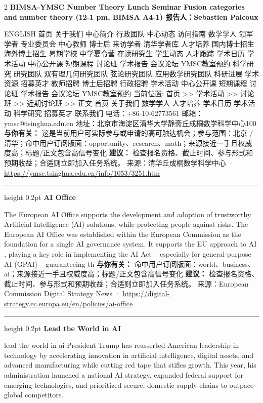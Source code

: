 \documentclass[10.5pt]{ctexart}
\begin{document}
\begin{multicols}{2}
{\large\bfseries BIMSA-YMSC Number Theory Lunch Seminar Fusion categories and number theory (12-1 pm, BIMSA A4-1) 报告人：Sebastien Palcoux}\par
ENGLISH 首页 关于我们 中心简介 行政团队 中心动态 访问指南 数学学人 领军学者 专业委员会 中心教师 博士后 来访学者 清华学者库 人才培养 国内博士招生 海外博士招生 暑期学校 中学夏令营 在读研究生 学生动态 人才跟踪 学术日历 学术活动 中心公开课 短期课程 讨论班 学术报告 会议论坛 YMSC教室预约 科学研究 研究团队 双有理几何研究团队 弦论研究团队 应用数学研究团队 科研进展 学术资源 招募英才 教师招聘 博士后招聘 行政招聘 学术活动 中心公开课 短期课程 讨论班 学术报告 会议论坛 YMSC教室预约 当前位置: 首页 >> 学术活动 >> 讨论班 >> 近期讨论班 >> 正文 首页 关于我们 数学学人 人才培养 学术日历 学术活动 科学研究 招募英才 联系我们 电话：+86-10-62773561 邮箱：ymsc@tsinghua.edu.cn 地址：北京市海淀区清华大学静斋丘成桐数学科学中心100
\textbf{与你有关：} 这是当前用户可实际参与或申请的高可触达机会；参与范围：北京 / 清华；命中用户订阅版面：opportunity、research、math；来源接近一手且权威度高；标题/正文包含高信号变化
\textbf{建议：} 检查报名资格、截止时间、参与形式和预期收益；合适则立即加入任务系统。
{\footnotesize\color{ormuted} 来源：清华丘成桐数学科学中心 · \url{https://ymsc.tsinghua.edu.cn/info/1053/3251.htm}}
\vspace{2mm}
\hrule height 0.2pt
\vspace{2mm}
{\large\bfseries AI Office}\par
The European AI Office supports the development and adoption of trustworthy Artificial Intelligence (AI) solutions, while protecting people against risks. The European AI Office was established within the European Commission as the foundation for a single AI governance system. It supports the EU approach to AI , playing a key role in implementing the AI Act – especially for general-purpose AI (GPAI) – guaranteeing th
\textbf{与你有关：} 命中用户订阅版面：world、business、ai；来源接近一手且权威度高；标题/正文包含高信号变化
\textbf{建议：} 检查报名资格、截止时间、参与形式和预期收益；合适则立即加入任务系统。
{\footnotesize\color{ormuted} 来源：European Commission Digital Strategy News · \url{https://digital-strategy.ec.europa.eu/en/policies/ai-office}}
\vspace{2mm}
\hrule height 0.2pt
\vspace{2mm}
{\large\bfseries Lead the World in AI}\par
lead the world in ai President Trump has reasserted American leadership in technology by accelerating innovation in artificial intelligence, digital assets, and advanced manufacturing while cutting red tape that stifles growth. This year, his administration launched a national AI strategy, expanded federal support for emerging technologies, and prioritized secure, domestic supply chains to outpace global competitors.

\end{multicols}
\end{document}
